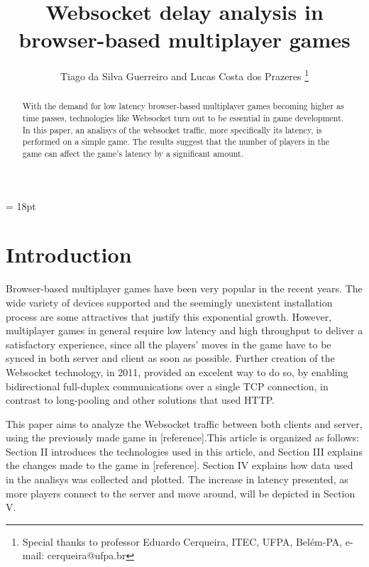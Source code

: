 \documentclass[english]{sbrt}
\begin{document}

\title{Websocket delay analysis in browser-based multiplayer games}

\author{Tiago da Silva Guerreiro and Lucas Costa dos Prazeres
  \thanks{Special thanks to professor Eduardo Cerqueira, ITEC, UFPA, Belém-PA, e-mail: cerqueira@ufpa.br}
}

\maketitle

\baselineskip = 18pt


\begin{abstract}
  With the demand for low latency browser-based multiplayer games becoming higher as time passes, technologies like Websocket turn out to be essential in game development. In this paper, an analisys of the websocket traffic, more specifically its latency, is performed on a simple game. The results suggest that the number of players in the game can affect the game's latency by a significant amount.
\end{abstract}

\begin{keywords}

\end{keywords}

\section{\textbf{Introduction}}
Browser-based multiplayer games have been very popular in the recent years. The wide variety of devices supported and the seemingly unexistent installation process are some attractives that justify this exponential growth. However, multiplayer games in general require low latency and high throughput to deliver a satisfactory experience, since all the players' moves in the game have to be synced in both server and client as soon as possible. Further creation of the Websocket technology, in 2011, provided an excelent way to do so, by enabling bidirectional full-duplex communications over a single TCP connection, in contrast to long-pooling and other solutions that used HTTP.

This paper aims to analyze the Websocket traffic between both clients and server, using the previously made game in [reference].This article is organized as follows: Section II introduces the technologies used in this article, and Section III explains the changes made to the game in [reference]. Section IV explains how data used in the analisys was collected and plotted. The increase in latency presented, as more players connect to the server and move around, will be depicted in Section V.
\end{document}
